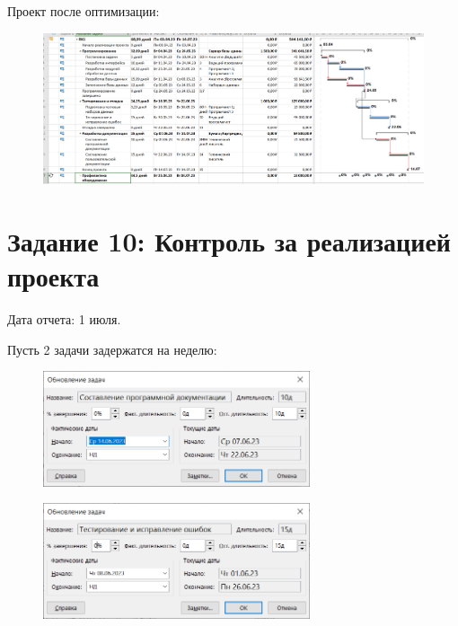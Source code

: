 Проект после оптимизации:

\begin{figure}[H]
	\begin{center}
		\includegraphics[width=\textwidth]{imgs/task_9_5.png}
	\end{center}
\end{figure}

\section*{Задание 10: Контроль за реализацией проекта}

Дата отчета: 1 июля.

Пусть 2 задачи задержатся на неделю:
\begin{figure}[H]
	\begin{center}
		\includegraphics[width=0.7\textwidth]{imgs/task_10_0.png}
	\end{center}
\end{figure}

\begin{figure}[H]
	\begin{center}
		\includegraphics[width=0.7\textwidth]{imgs/task_10_1.png}
	\end{center}
\end{figure}

